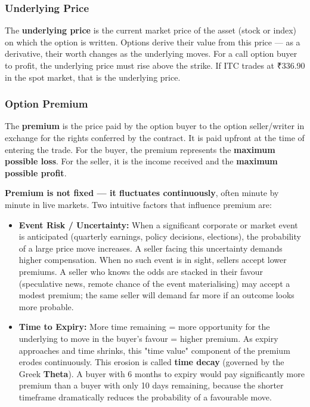 \documentclass[12pt,openany]{book}
\begin{document}
\subsubsection{Underlying Price}

The \textbf{underlying price} is the current market price of the asset (stock or index) on which the option is written. Options derive their value from this price — as a derivative, their worth changes as the underlying moves. For a call option buyer to profit, the underlying price must rise above the strike. If ITC trades at ₹336.90 in the spot market, that is the underlying price.

\subsubsection{Option Premium}

The \textbf{premium} is the price paid by the option buyer to the option seller/writer in exchange for the rights conferred by the contract. It is paid upfront at the time of entering the trade. For the buyer, the premium represents the \textbf{maximum possible loss}. For the seller, it is the income received and the \textbf{maximum possible profit}.

\textbf{Premium is not fixed — it fluctuates continuously}, often minute by minute in live markets. Two intuitive factors that influence premium are:

\begin{itemize}[leftmargin=*]
    \item \textbf{Event Risk / Uncertainty:} When a significant corporate or market event is anticipated (quarterly earnings, policy decisions, elections), the probability of a large price move increases. A seller facing this uncertainty demands higher compensation. When no such event is in sight, sellers accept lower premiums. A seller who knows the odds are stacked in their favour (speculative news, remote chance of the event materialising) may accept a modest premium; the same seller will demand far more if an outcome looks more probable.
\end{itemize}

\begin{itemize}[leftmargin=*]
    \item \textbf{Time to Expiry:} More time remaining = more opportunity for the underlying to move in the buyer's favour = higher premium. As expiry approaches and time shrinks, this "time value" component of the premium erodes continuously. This erosion is called \textbf{time decay} (governed by the Greek \textbf{Theta}). A buyer with 6 months to expiry would pay significantly more premium than a buyer with only 10 days remaining, because the shorter timeframe dramatically reduces the probability of a favourable move.
\end{itemize}
\end{document}
